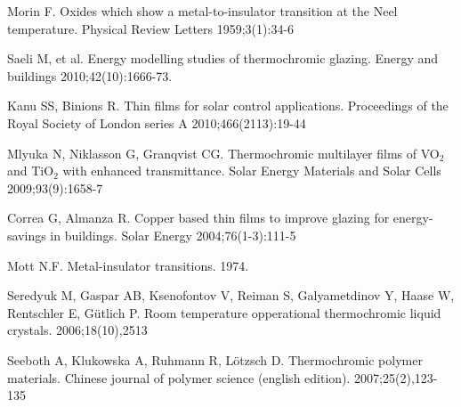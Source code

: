 \begin{thebibliography}{9}
      Morin F.
      Oxides which show a metal-to-insulator transition at the Neel temperature.
      Physical Review Letters 1959;3(1):34-6

      Saeli M, et al.
      Energy modelling studies of thermochromic glazing. 
      Energy and buildings 2010;42(10):1666-73.

      Kanu SS, Binions R. 
      Thin films for solar control applications. 
      Proceedings of the Royal Society of London series A 2010;466(2113):19-44

      Mlyuka N, Niklasson G, Granqvist CG. 
      Thermochromic multilayer films of VO$_2$ and TiO$_2$ with enhanced transmittance.
      Solar Energy Materials and Solar Cells 2009;93(9):1658-7

      Correa G, Almanza R. 
      Copper based thin films to improve glazing for energy-savings in buildings. 
      Solar Energy 2004;76(1-3):111-5

      Mott N.F. 
      Metal-insulator transitions. 
      1974.

      Seredyuk M, Gaspar AB, Ksenofontov V, Reiman S, Galyametdinov Y, Haase W, Rentschler E, Gütlich P.
      Room temperature opperational thermochromic liquid crystals.
      2006;18(10),2513

      Seeboth A, Klukowska A, Ruhmann R, Lötzsch D.
      Thermochromic polymer materials.
      Chinese journal of polymer science (english edition). 
      2007;25(2),123-135
\end{thebibliography}
